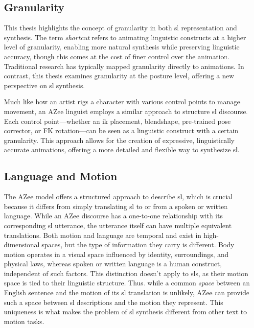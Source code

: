 \documentclass[../../main.tex]{subfiles}
\begin{document}
\subsection{Granularity}
\label{ch:conclusion:key_insights:granularity}

This thesis highlights the concept of granularity in both \gls{sl} representation and synthesis. The term \emph{shortcut} refers to animating linguistic constructs at a higher level of granularity, enabling more natural synthesis while preserving linguistic accuracy, though this comes at the cost of finer control over the animation. Traditional research has typically mapped granularity directly to animations. In contrast, this thesis examines granularity at the posture level, offering a new perspective on \gls{sl} synthesis.

Much like how an artist rigs a character with various control points to manage movement, an AZee linguist employs a similar approach to structure \gls{sl} discourse. Each control point—whether an \gls{ik} placement, blendshape, pre-trained pose corrector, or FK rotation—can be seen as a linguistic construct with a certain granularity. This approach allows for the creation of expressive, linguistically accurate animations, offering a more detailed and flexible way to synthesize \gls{sl}.

\subsection{Language and Motion}
\label{ch:conclusion:key_insights:language_motion}

The AZee model offers a structured approach to describe \gls{sl}, which is crucial because it differs from simply translating \gls{sl} to or from a spoken or written language. While an AZee discourse has a one-to-one relationship with its corresponding \gls{sl} utterance, the utterance itself can have multiple equivalent translations. Both motion and language are temporal and exist in high-dimensional spaces, but the type of information they carry is different. Body motion operates in a visual space influenced by identity, surroundings, and physical laws, whereas spoken or written language is a human construct, independent of such factors. This distinction doesn't apply to \gls{sl}s, as their motion space is tied to their linguistic structure. Thus. while a common \emph{space} between an English sentence and the motion of its \gls{sl} translation is unlikely, AZee can provide such a space between \gls{sl} descriptions and the motion they represent. This uniqueness is what makes the problem of \gls{sl} synthesis different from other text to motion tasks.
\end{document}
